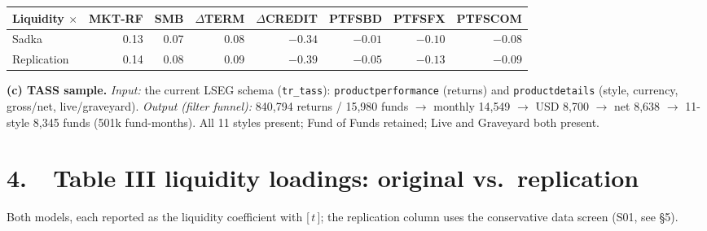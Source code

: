 \documentclass[10pt]{article}
\begin{document}
{\footnotesize
\begin{center}
\begin{tabular}{lrrrrrrr}
\toprule
Liquidity $\times$ & MKT-RF & SMB & $\Delta$TERM & $\Delta$CREDIT & PTFSBD & PTFSFX & PTFSCOM \\
\midrule
Sadka       & 0.13 & 0.07 & 0.08 & $-0.34$ & $-0.01$ & $-0.10$ & $-0.08$ \\
Replication & 0.14 & 0.08 & 0.09 & $-0.39$ & $-0.05$ & $-0.13$ & $-0.09$ \\
\bottomrule
\end{tabular}
\end{center}}

\textbf{(c) TASS sample.} \emph{Input:} the current LSEG schema (\texttt{tr\_tass}):
\texttt{productperformance} (returns) and \texttt{productdetails} (style, currency, gross/net,
live/graveyard). \emph{Output (filter funnel):} 840{,}794 returns / 15{,}980 funds $\rightarrow$
monthly 14{,}549 $\rightarrow$ USD 8{,}700 $\rightarrow$ net 8{,}638 $\rightarrow$ 11-style
8{,}345 funds (501k fund-months). All 11 styles present; Fund of Funds retained; Live and
Graveyard both present.

\section*{4.\ \ Table III liquidity loadings: original vs.\ replication}
Both models, each reported as the liquidity coefficient with [\,$t$\,]; the replication column
uses the conservative data screen (S01, see \S5).
\end{document}
